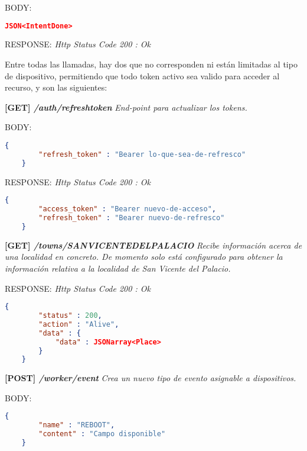     BODY:
    \begin{lstlisting}[language=json,firstnumber=1]
    JSON<IntentDone>
    \end{lstlisting}
    
    RESPONSE: \newline
    \textit{Http Status Code 200 : Ok}
    
\newpage %

Entre todas las llamadas, hay dos que no corresponden ni están limitadas al tipo de dispositivo, permitiendo que todo token activo sea valido para acceder al recurso, y son las siguientes:

\textbf{[GET] \textit{/auth/refreshtoken }}
\textit{End-point para actualizar los tokens.}

    BODY:
    \begin{lstlisting}[language=json,firstnumber=1]
    {
        "refresh_token" : "Bearer lo-que-sea-de-refresco"
    }
    \end{lstlisting}    

    RESPONSE: \newline
    \textit{Http Status Code 200 : Ok}
    
    \begin{lstlisting}[language=json,firstnumber=1]
    {
        "access_token" : "Bearer nuevo-de-acceso",
        "refresh_token" : "Bearer nuevo-de-refresco"
    }
    \end{lstlisting}
\hline 
\newline
\textbf{[GET] \textit{/towns/SANVICENTEDELPALACIO }}
\textit{Recibe información acerca de una localidad en concreto. De momento solo está configurado para obtener la información relativa a la localidad de San Vicente del Palacio.}
    
    RESPONSE: \newline
    \textit{Http Status Code 200 : Ok}
    \begin{lstlisting}[language=json,firstnumber=1]
    {
        "status" : 200,
        "action" : "Alive",
        "data" : {
            "data" : JSONarray<Place>
        }
    }
    \end{lstlisting}

\newpage %
\textbf{[POST] \textit{/worker/event }}
\textit{Crea un nuevo tipo de evento asignable a dispositivos.}
    
    BODY:
   \begin{lstlisting}[language=json,firstnumber=1]
    {
        "name" : "REBOOT",
        "content" : "Campo disponible"
    }
    \end{lstlisting} 
    
